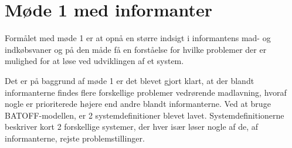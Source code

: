 \section{Møde 1 med informanter}
Formålet med møde 1 er at opnå en større indsigt i informantens mad- og indkøbsvaner og på den måde få en forståelse for hvilke problemer der er mulighed for at løse ved udviklingen af et system.

Det er på baggrund af møde 1 er det blevet gjort klart, at der blandt informanterne findes flere forskellige problemer vedrørende madlavning, hvoraf nogle er prioriterede højere end andre blandt informanterne. Ved at bruge BATOFF-modellen, er 2 systemdefinitioner blevet lavet. Systemdefinitionerne beskriver kort 2 forskellige systemer, der hver især løser nogle af de, af informanterne, rejste problemstillinger.
